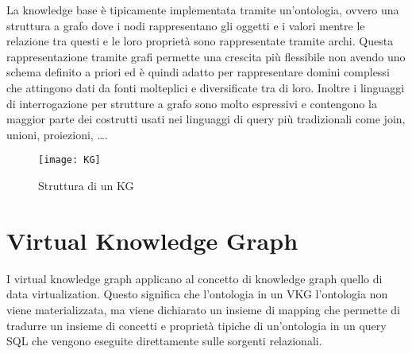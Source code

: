 La knowledge base è tipicamente implementata tramite un'ontologia, ovvero una struttura a grafo dove i nodi rappresentano gli oggetti e i valori mentre le relazione tra questi 
e le loro proprietà sono rappresentate tramite archi. Questa rappresentazione tramite grafi permette una crescita più flessibile non avendo uno schema definito a priori ed è quindi adatto
per rappresentare domini complessi che attingono dati da fonti molteplici e diversificate tra di loro. Inoltre i linguaggi di interrogazione per strutture a grafo sono molto espressivi e 
contengono la maggior parte dei costrutti usati nei linguaggi di query più tradizionali come join, unioni, proiezioni, \dots \cite{KGIntro}.


\begin{figure}[h]
    \centering
    \texttt{[image: KG]}
    \caption{Struttura di un KG}
    \label{fig:KG}
\end{figure}


\section{Virtual Knowledge Graph}
\label{sec:vkg_description}
I virtual knowledge graph applicano al concetto di knowledge graph quello di data virtualization. Questo significa che l'ontologia in un VKG l'ontologia non viene materializzata, ma viene dichiarato un insieme di mapping 
che permette di tradurre un insieme di concetti e proprietà tipiche di un'ontologia in un query SQL che vengono eseguite direttamente sulle sorgenti relazionali. 

